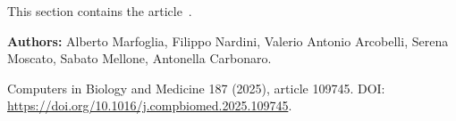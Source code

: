 
\noindent This section contains the article~\cite{marfoglia_towards_2025}.

\begin{paperheader}
\textbf{Authors:} Alberto Marfoglia, Filippo Nardini, Valerio Antonio Arcobelli, Serena Moscato, Sabato Mellone, Antonella Carbonaro.\par
Computers in Biology and Medicine 187 (2025), article 109745. DOI: \url{https://doi.org/10.1016/j.compbiomed.2025.109745}.
\end{paperheader}

